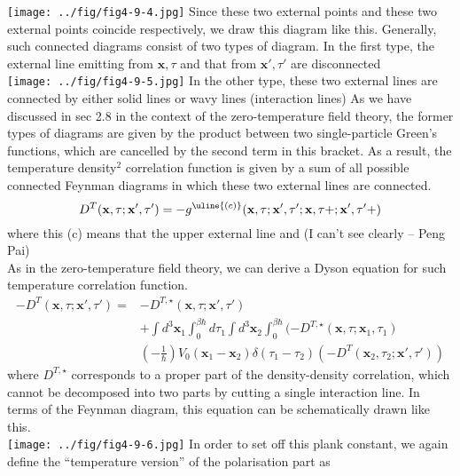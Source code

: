 \texttt{[image: ../fig/fig4-9-4.jpg]}
 Since these two external points and these two external points coincide respectively, we draw this diagram like this.
 Generally, such connected diagrams consist of two types of diagram.
 In the first type, the external line emitting from $\mathbf x,\tau$ and that from $\mathbf x',\tau'$ are disconnected\\
\texttt{[image: ../fig/fig4-9-5.jpg]}
 In the other type, these two external lines are connected by either solid lines or wavy lines (interaction lines)
 As we have discussed in sec 2.8 in the context of the zero-temperature field theory, the former types of diagrams are given by the product between two single-particle Green's functions, which are cancelled by the second term in this bracket.
 As a result, the temperature density$^2$ correlation function is given by a sum of all possible connected Feynman diagrams in which these two external lines are connected.
\begin{equation}
D^T(\mathbf x,\tau;\mathbf x',\tau')=-g^{\uline{(c)}}(\mathbf x,\tau;\mathbf x',\tau';\mathbf x,\tau+;\mathbf x',\tau'+)
\end{equation}
where this (c) means that the upper external line and (I can't see clearly -- Peng Pai)\\
As in the zero-temperature field theory, we can derive a Dyson equation for such temperature correlation function.
\begin{equation}
\begin{aligned}
-D^{T}(\mathbf x,\tau;\mathbf x',\tau')=&-D^{T,\star}(\mathbf x,\tau;\mathbf x',\tau')\\
&+\int d^3\mathbf x_1 \int_0^{\beta\hbar}d\tau_1\int d^3\mathbf x_2\int _0^{\beta\hbar}(-D^{T,\star}(\mathbf x,\tau;\mathbf x_1,\tau_1)\\
&\left(-\frac{1}{\hbar}\right)V_0(\mathbf x_1-\mathbf x_2)\delta(\tau_1-\tau_2)\left(-D^T(\mathbf x_2,\tau_2;\mathbf x',\tau')\right)
\end{aligned}
\end{equation}
where $D^{T,\star}$ corresponds to a proper part of the density-density correlation, which cannot be decomposed into two parts by cutting a single interaction line.
 In terms of the Feynman diagram, this equation can be schematically drawn like this.\\
\texttt{[image: ../fig/fig4-9-6.jpg]}
 In order to set off this plank constant, we again define the ``temperature version'' of the polarisation part as
